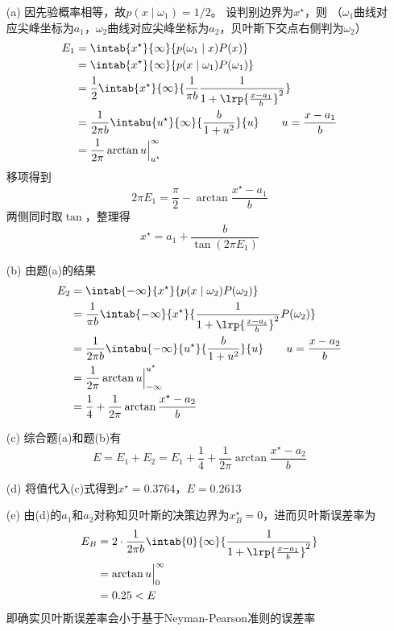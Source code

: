 \documentclass[reportComp]{thesis}
\begin{document}
\begin{answer}
\begin{itemize}
	\item [(a)] 因先验概率相等，故$p(x\mid\omega_1)=1/2$。
	设判别边界为$x^\star$，则
	（$\omega_1$曲线对应尖峰坐标为$a_1$，$\omega_2$曲线对应尖峰坐标为$a_2$，贝叶斯下交点右侧判为$\omega_2$）
	\[\begin{aligned}
	E_1&=\intab{x^\star}{\infty}{p(\omega_1\mid x)P(x)}\\
	&=\intab{x^\star}{\infty}{p(x\mid\omega_1)P(\omega_1)}\\
	&=\frac{1}{2}\intab{x^\star}{\infty}{\frac{1}{\pi b}\frac{1}{1+\lrp{\frac{x-a_1}{b}}^2}}\\
	&=\frac{1}{2\pi b}\intabu{u^\star}{\infty}{\frac{b}{1+u^2}}{u}\qquad u=\frac{x-a_1}{b}\\
	&=\frac{1}{2\pi}\arctan u\Big|_{u^\star}^{\infty}
	\end{aligned}\]
	移项得到
	\[2\pi E_1=\frac{\pi}{2}-\arctan\frac{x^\star-a_1}{b}\]
	两侧同时取$\tan$，整理得
	\[x^\star=a_1+\frac{b}{\tan(2\pi E_1)}\]

	\item [(b)] 由题(a)的结果
	\[\begin{aligned}
	E_2&=\intab{-\infty}{x^\star}{p(x\mid\omega_2)P(\omega_2)}\\
	&=\frac{1}{\pi b}\intab{-\infty}{x^\star}{\frac{1}{1+\lrp{\frac{x-a_i}{b}}^2}P(\omega_2)}\\
	&=\frac{1}{2\pi b}\intabu{-\infty}{u^\star}{\frac{b}{1+u^2}}{u}\qquad u=\frac{x-a_2}{b}\\
	&=\frac{1}{2\pi}\arctan u\Big|_{-\infty}^{u^\star}\\
	&=\frac{1}{4}+\frac{1}{2\pi}\arctan\frac{x^\star-a_2}{b}
	\end{aligned}\]
	
	\item [(c)] 综合题(a)和题(b)有
	\[E=E_1+E_2=E_1+\frac{1}{4}+\frac{1}{2\pi}\arctan\frac{x^\star-a_2}{b}\]
	
	\item [(d)] 将值代入(c)式得到$x^\star=0.3764$，$E=0.2613$
	
	\item [(e)] 由(d)的$a_1$和$a_2$对称知贝叶斯的决策边界为$x_B^\star=0$，进而贝叶斯误差率为
	\[\begin{aligned}
	E_B&=2\cdot\frac{1}{2\pi b}\intab{0}{\infty}{\frac{1}{1+\lrp{\frac{x-a_1}{b}}^2}}\\
	&=\arctan u\Big|_0^\infty\\
	&=0.25<E
	\end{aligned}\]
	即确实贝叶斯误差率会小于基于Neyman-Pearson准则的误差率
\end{itemize}
\end{answer}
\end{document}
